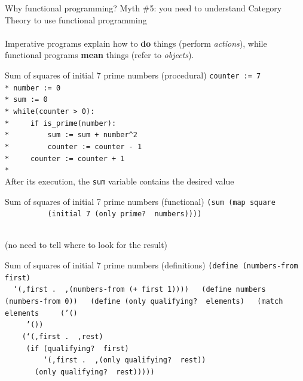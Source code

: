 \documentclass{beamer}
\begin{document}
\begin{frame}{Why functional programming?} \pause
  Myth \#5: you need to understand Category Theory to use
  functional programming \\ \pause
  \ \\ \pause
  {\large Imperative programs explain how to \textbf{do} things
  (perform \textit{actions}), while
  functional programs \textbf{mean} things (refer to \textit{objects}).}
  
\end{frame}

\begin{frame}{Sum of squares of initial 7 prime numbers (procedural)} \pause
  \texttt{counter := 7\\* \pause
number := 0\\* \pause
sum := 0\\* \pause
while(counter > 0):\\* \pause
\ \ \ \ if is\_prime(number):\\* \pause
\ \ \ \ \ \ \ \ sum := sum + number\^{}2\\* \pause
\ \ \ \ \ \ \ \ counter := counter - 1\\* \pause
\ \ \ \ counter := counter + 1\\* 
  } \ \\ \pause
  After its execution, the \texttt{sum} variable contains the
  desired value
\end{frame}

\begin{frame}{Sum of squares of initial 7 prime numbers (functional)} \pause
  \texttt{(sum (map square \\
    \ \ \ \ \ \ \ \ \ \ (initial 7 (only prime?\,\,numbers))))} \\ \ \\ \pause
  \begin{center}
    {\footnotesize (no need to tell where to look for the result)}
  \end{center}
\end{frame}

\begin{frame}{Sum of squares of initial 7 prime numbers (definitions)} \pause
  \texttt{(define (numbers-from first)\\
    \ \ `(,first .\,\,,(numbers-from (+ first 1))))\\
    \ \\ \pause
    (define numbers (numbers-from 0))\\
    \ \\ \pause
    (define (only qualifying?\,\,elements)\\ \pause
    \ \ (match elements\\ \pause
    \ \ \ \ ('()\\
    \ \ \ \ \ '())\\ \pause
    \ \ \ \ (`(,first .\,\,,rest)\\ \pause
    \ \ \ \ \ (if (qualifying?\,\,first)\\
    \ \ \ \ \ \ \ \ \ `(,first .\,\,,(only qualifying?\,\,rest))\\ \pause
    \ \ \ \ \ \ \ (only qualifying?\,\,rest)))))\\
    }    
\end{frame}
\end{document}
